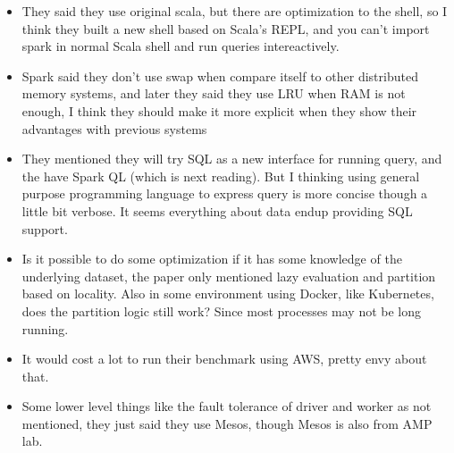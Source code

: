 \documentclass[12pt,a4paper,oneside]{article}
\begin{document}
\begin{itemize}
  \item They said they use original scala, but there are optimization to the shell, so I think they built a new shell based on Scala's REPL,
  and you can't import spark in normal Scala shell and run queries intereactively.
  \item Spark said they don't use swap when compare itself to other distributed memory systems, and later they said they use LRU when RAM is
  not enough, I think they should make it more explicit when they show their advantages with previous systems
  \item They mentioned they will try SQL as a new interface for running query, and the have Spark QL (which is next reading).
  But I thinking using general purpose programming language to express query is more concise though a little bit verbose. It seems everything about data endup providing SQL support.
  \item Is it possible to do some optimization if it has some knowledge of the underlying dataset, the paper only mentioned lazy evaluation and
  partition based on locality. Also in some environment using Docker, like Kubernetes, does the partition logic still work? Since most processes may not be long running.
  \item It would cost a lot to run their benchmark using AWS, pretty envy about that.
  \item Some lower level things like the fault tolerance of driver and worker as not mentioned, they just said they use
  Mesos, though Mesos is also from AMP lab.
\end{itemize}
\end{document}
